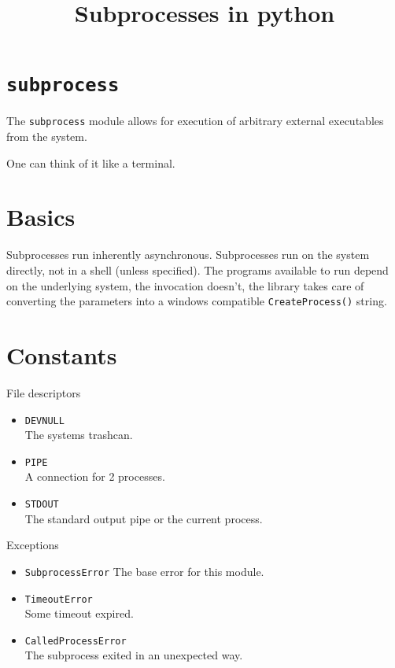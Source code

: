 \documentclass[ignorenonframetext,]{beamer}
\title{Subprocesses in python}
\date{}
\begin{document}
\frame{\titlepage}

\section{\texorpdfstring{\texttt{subprocess}}{subprocess}}\label{subprocess}

\begin{frame}

The \texttt{subprocess} module allows for execution of arbitrary
external executables from the system.

One can think of it like a terminal.

\end{frame}

\section{Basics}\label{basics}

\begin{frame}

Subprocesses run inherently asynchronous. Subprocesses run on the system
directly, not in a shell (unless specified). The programs available to
run depend on the underlying system, the invocation doesn't, the library
takes care of converting the parameters into a windows compatible
\texttt{CreateProcess()} string.

\end{frame}

\section{Constants}\label{constants}

\begin{frame}{File descriptors}

\begin{itemize}
\itemsep1pt\parskip0pt
\item
  \texttt{DEVNULL}\\The systems trashcan.
\item
  \texttt{PIPE}\\A connection for 2 processes.
\item
  \texttt{STDOUT}\\The standard output pipe or the current process.
\end{itemize}

\end{frame}

\begin{frame}{Exceptions}

\begin{itemize}
\itemsep1pt\parskip0pt
\item
  \texttt{SubprocessError} The base error for this module.
\item
  \texttt{TimeoutError}\\Some timeout expired.
\item
  \texttt{CalledProcessError}\\The subprocess exited in an unexpected
  way.
\end{itemize}

\end{frame}
\end{document}
